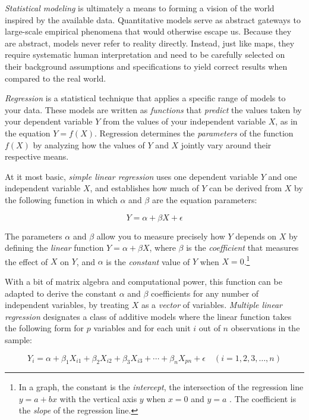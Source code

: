 \emph{Statistical modeling} is ultimately a means to forming a vision of the world inspired by the available data. Quantitative models serve as abstract gateways to large-scale empirical phenomena that would otherwise escape us. Because they are abstract, models never refer to reality directly. Instead, just like maps, they require systematic human interpretation and need to be carefully selected on their background assumptions and specifications to yield correct results when compared to the real world.

\emph{Regression} is a statistical technique that applies a specific range of models to your data. These models are written as \emph{functions} that \emph{predict} the values taken by your dependent variable $Y$ from the values of your independent variable $X$, as in the equation $Y = f(X)$. Regression determines the \emph{parameters} of the function $f(X)$ by analyzing how the values of $Y$ and $X$ jointly vary around their respective means.

At it most basic, \emph{simple linear regression} uses one dependent variable $Y$ and one independent variable $X$, and establishes how much of $Y$ can be derived from $X$ by the following function in which $\alpha$ and $\beta$ are the equation parameters:

$$Y = \alpha + \beta X + \epsilon$$%

The parameters $\alpha$ and $\beta$ allow you to measure precisely how $Y$ depends on $X$ by defining the \emph{linear} function $Y = \alpha + \beta X$, where $\beta$ is the \emph{coefficient} that measures the effect of $X$ on $Y$, and $\alpha$ is the \emph{constant} value of $Y$ when $X = 0$.\footnote{In a graph, the constant is the \emph{intercept}, \ie the intersection of the regression line $y = a + bx$ with the vertical axis $y$ when $x = 0$ and $y = a$ . The coefficient is the \emph{slope} of the regression line.}

With a bit of matrix algebra and computational power, this function can be adapted to derive the constant $\alpha$ and $\beta$ coefficients for any number of independent variables, by treating $X$ as a \emph{vector} of variables. \emph{Multiple linear regression} designates a class of additive models where the linear function takes the following form for $p$ variables and for each unit $i$ out of $n$ observations in the sample:

$$Y_i = \alpha + \beta_1 X_{i1} + \beta_2 X_{i2} + \beta_3 X_{i3} + \cdots + \beta_n X_{pn} + \epsilon \quad (i = 1, 2, 3, \ldots, n) $$ %

